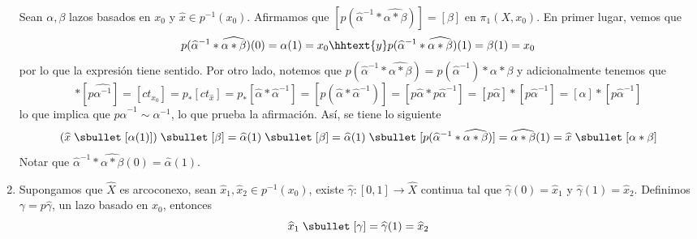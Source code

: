 \documentclass{article}
\begin{document}
\begin{enumerate}
    \vspace{1mm}
    Sean $\alpha,\beta$ lazos basados en $x_{0}$ y $\widehat{x}\in p^{-1}(x_{0})$. Afirmamos que
    $[p(\widehat{\alpha}^{-1}*\widehat{\alpha*\beta})]=[\beta]$ en $\pi_{1}(X,x_{0})$. En primer
    lugar, vemos que
    \begin{equation*}
        p(\widehat{\alpha}^{-1}*\widehat{\alpha*\beta})(0)=\alpha(1)=x_{0}
        \hhtext{y}
        p(\widehat{\alpha}^{-1}*\widehat{\alpha*\beta})(1)=\beta(1)=x_{0}
    \end{equation*}
    por lo que la expresión tiene sentido. Por otro lado, notemos que 
    $p(\widehat{\alpha}^{-1}*\widehat{\alpha*\beta})=p(\widehat{\alpha}^{-1})*\alpha*\beta$ y
    adicionalmente tenemos que
    \begin{equation*}
        [\alpha]*[p\widehat{\alpha^{-1}}]=[ct_{x_{0}}]=p_{*}[ct_{\widehat{x}}]
        =p_{*}[\widehat{\alpha}*\widehat{\alpha}^{-1}]=[p(\widehat{\alpha}*\widehat{\alpha}^{-1})]
        =[p\widehat{\alpha}*p\widehat{\alpha}^{-1}]=[p\widehat{\alpha}]*[p\widehat{\alpha}^{-1}]
        =[\alpha]*[p\widehat{\alpha}^{-1}]
    \end{equation*}
    lo que implica que $p\widehat{\alpha}^{-1}\sim\alpha^{-1}$, lo que prueba la afirmación. Así,
    se tiene lo siguiente
    \begin{equation*}
        (\widehat{x}\hspace{1mm}{\sbullet}\hspace{1mm}[\alpha(1)])
        \hspace{1mm}{\sbullet}\hspace{1mm}[\beta]
        =\widehat{\alpha}(1)\hspace{1mm}{\sbullet}\hspace{1mm}[\beta]
        =\widehat{\alpha}(1)\hspace{1mm}{\sbullet}\hspace{1mm}[
            p(\widehat{\alpha}^{-1}*\widehat{\alpha*\beta})
        ]=\widehat{\alpha*\beta}(1)=\widehat{x}\hspace{1mm}{\sbullet}\hspace{1mm}[\alpha*\beta]
    \end{equation*}
    Notar que $\widehat{\alpha}^{-1}*\widehat{\alpha*\beta}(0)=\widehat{\alpha}(1)$.
    
    \item Supongamos que $\widehat{X}$ es arcoconexo, sean $\widehat{x}_{1},\widehat{x}_{2}\in 
    p^{-1}(x_{0})$, existe $\widehat{\gamma}:[0,1]\to\widehat{X}$ continua tal que 
    $\widehat{\gamma}(0)=\widehat{x}_{1}$ y $\widehat{\gamma}(1)=\widehat{x}_{2}$. Definimos 
    $\gamma=p\widehat{\gamma}$, un lazo basado en $x_{0}$, entonces
    \begin{equation*}
        \widehat{x}_{1}\hspace{1mm}{\sbullet}\hspace{1mm}[\gamma]
        =\widehat{\gamma}(1)=\widehat{x}_{2}
    \end{equation*}


\end{enumerate}
\end{document}
